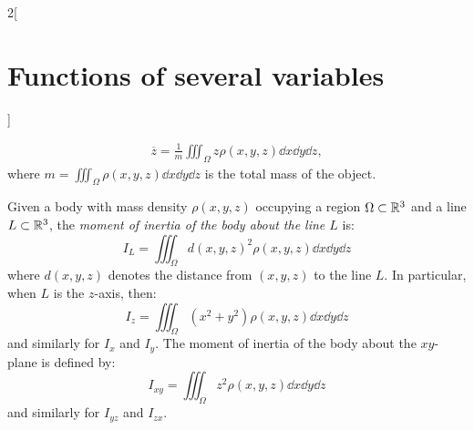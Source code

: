 \documentclass[../../../main.tex]{subfiles}
\begin{document}
\begin{multicols}{2}[\section{Functions of several variables}]
\begin{definition}
\begin{gather*}
      \overline{z}=\frac{1}{m}\iiint_\Omega z\rho(x,y,z)\dd x\dd y\dd z,
    \end{gather*}
    where $\displaystyle m=\iiint_\Omega\rho(x,y,z)\dd x\dd y\dd z$ is the total mass of the object.
  \end{definition}
  \begin{definition}
    Given a body with mass density $\rho(x,y,z)$ occupying a region $\Omega\subset\mathbb{R}^3$ and a line $L\subset\mathbb{R}^3$, the \textit{moment of inertia of the body about the line $L$} is: $$I_L=\iiint_\Omega d(x,y,z)^2\rho(x,y,z)\dd x\dd y\dd z$$ where $d(x,y,z)$ denotes the distance from $(x,y,z)$ to the line $L$. In particular, when $L$ is the $z$-axis, then: $$I_z=\iiint_\Omega (x^2+y^2)\rho(x,y,z)\dd x\dd y\dd z$$ and similarly for $I_x$ and $I_y$. The moment of inertia of the body about the $xy$-plane is defined by: $$I_{xy}=\iiint_\Omega z^2\rho(x,y,z)\dd x\dd y\dd z$$ and similarly for $I_{yz}$ and $I_{zx}.$
  \end{definition}

\end{multicols}
\end{document}
